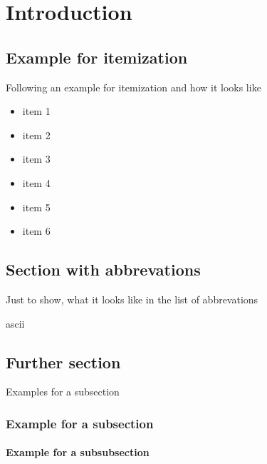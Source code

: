 

\chapter{Introduction}


\section{Example for itemization }

Following an example for itemization and how it looks like
\begin{itemize}
\item item 1
\item item 2
\item item 3
\item item 4
\item item 5
\item item 6
\end{itemize}

\section{Section with abbrevations}

Just to show, what it looks like in the list of abbrevations

\acrfull{ascii}

\section{Further section}

Examples for a subsection

\subsection{Example for a subsection}



\subsubsection{Example for a subsubsection}




